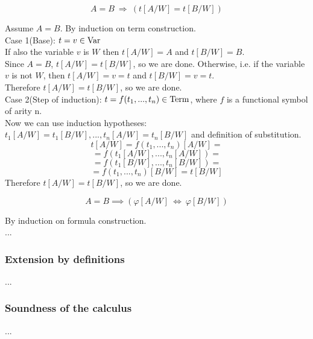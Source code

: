 \begin{theorem}
\[
A=B\ \Longrightarrow\ (t[A/W]=t[B/W])
\]
\end{theorem}
\Proof
Assume $A=B$.
By induction on term construction.\\
Case 1(Base): $t=v\in \mathrm{Var}$\\
If also the variable $v$ is $W$ then $t[A/W]=A$ and $t[B/W]=B$.\\
Since $A=B$, $t[A/W]=t[B/W]$, so we are done.
Otherwise, i.e. if the variable $v$ is not $W$, then $t[A/W]=v=t$ and $t[B/W]=v=t$.\\
Therefore $t[A/W]=t[B/W]$, so we are done.\\
Case 2(Step of induction): $t=f(t_1,...,t_n)\in\mathrm{Term}$, where $f$ is a functional symbol of arity n.\\
Now we can use induction hypotheses: $t_1[A/W]=t_1[B/W],...,t_n[A/W]=t_n[B/W]$ and definition of substitution.
\[
t[A/W]=f(t_1,...,t_n)[A/W]=
\]
\[
=f(t_1[A/W],...,t_n[A/W])=
\]
\[
=f(t_1[B/W],...,t_n[B/W])=
\]
\[
=f(t_1,...,t_n)[B/W]=t[B/W]
\]
Therefore $t[A/W]=t[B/W]$, so we are done.\\
\Done

\begin{theorem}
\[
A=B
\implies
(\varphi[A/W]\ \Longleftrightarrow\ \varphi[B/W])
\]
\end{theorem}
\Proof
By induction on formula construction.\\
...\\
\Done

\subsubsection{Extension by definitions}
...

\subsubsection{Soundness of the calculus}
...
\pagebreak

